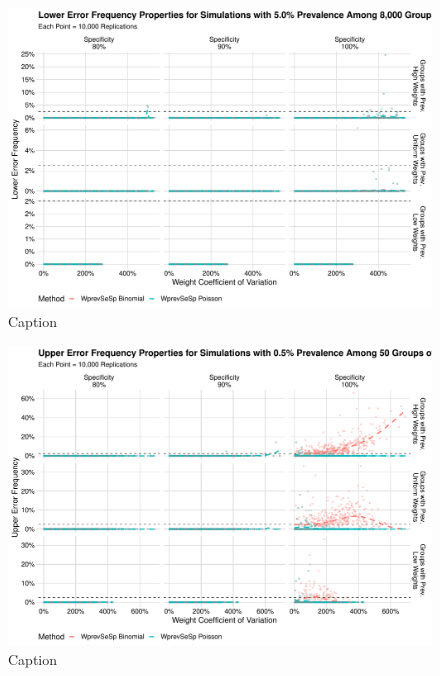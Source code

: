 \documentclass[AMA,STIX1COL]{WileyNJD-v2}
\begin{document}
\begin{figure}
    \centering
    \includegraphics[width=\textwidth]{figures/imperfect_lower_error_frequency_8000_0_05_reduced.pdf}
    \caption{Caption}
    \label{fig:imperfect_lower_error_frequency_8000_0_05_reduced.pdf}
\end{figure}

\begin{figure}
    \centering
    \includegraphics[width=\textwidth]{figures/imperfect_upper_error_frequency_50_0_005_reduced.pdf}
    \caption{Caption}
    \label{fig:imperfect_upper_error_frequency_50_0_005_reduced}
\end{figure}
\end{document}
